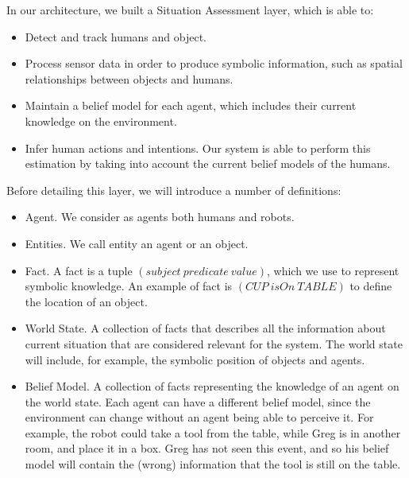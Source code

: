 In our architecture, we built a Situation Assessment layer, which is able to:
\begin{itemize}
\item  Detect and track humans and object.
\item  Process sensor data in order to produce symbolic information, such as spatial relationships between objects and humans.
\item  Maintain a belief model for each agent, which includes their current knowledge on the environment.
\item  Infer human actions and intentions. Our system is able to perform this estimation by taking into account the current belief models of the humans. 
\end{itemize} 

Before detailing this layer, we will introduce a number of definitions:
\begin{itemize}
\item Agent. We consider as agents both humans and robots.
\item Entities. We call entity an agent or an object.
\item Fact. A fact is a tuple $(subject\> predicate\> value)$, which we use to represent symbolic knowledge. An example of fact is $(CUP\> isOn\> TABLE)$ to define the location of an object. 
\item World State. A collection of facts that describes all the information about current situation that are considered relevant for the system. The world state will include, for example, the symbolic position of objects and agents.
\item Belief Model. A collection of facts representing the knowledge of an agent on the world state. Each agent can have a different belief model, since the environment can change without an agent being able to perceive it. For example, the robot could take a tool from the table, while Greg is in another room, and place it in a box. Greg has not seen this event, and so his belief model will contain the (wrong) information that the tool is still on the table.
\end{itemize}

